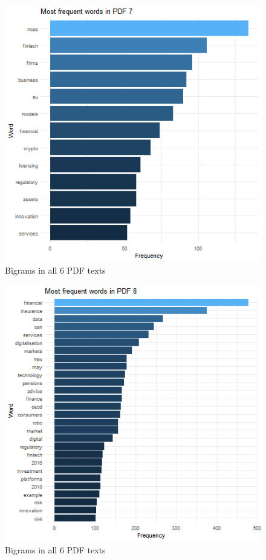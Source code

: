 \documentclass[
]{book}
\begin{document}
\begin{figure}

{\centering \includegraphics[width=0.8\linewidth]{img/freqP7} 

}

\caption{Bigrams in all 6 PDF texts}\label{fig:nice-figF7-16-1}
\end{figure}
\begin{figure}

{\centering \includegraphics[width=0.8\linewidth]{img/freqP8} 

}

\caption{Bigrams in all 6 PDF texts}\label{fig:nice-figF7-16-2}
\end{figure}
\end{document}
